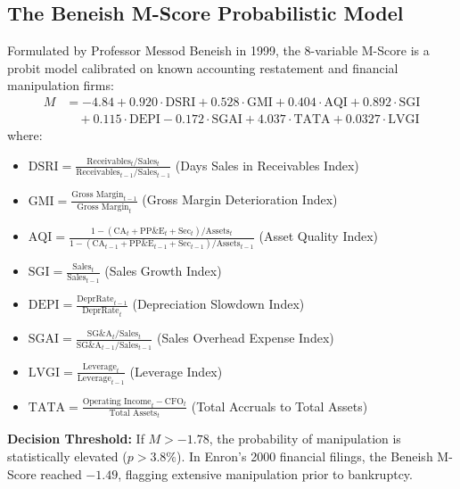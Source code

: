 \subsection{The Beneish M-Score Probabilistic Model}
Formulated by Professor Messod Beneish in 1999, the 8-variable M-Score is a probit model calibrated on known accounting restatement and financial manipulation firms:
\begin{align}
M &= -4.84 + 0.920 \cdot \text{DSRI} + 0.528 \cdot \text{GMI} + 0.404 \cdot \text{AQI} + 0.892 \cdot \text{SGI} \nonumber \\
&\quad + 0.115 \cdot \text{DEPI} - 0.172 \cdot \text{SGAI} + 4.037 \cdot \text{TATA} + 0.0327 \cdot \text{LVGI}
\label{eq:beneish_m}
\end{align}
where:
\begin{itemize}
    \item $\text{DSRI} = \frac{\text{Receivables}_t / \text{Sales}_t}{\text{Receivables}_{t-1} / \text{Sales}_{t-1}}$ (Days Sales in Receivables Index)
    \item $\text{GMI} = \frac{\text{Gross Margin}_{t-1}}{\text{Gross Margin}_t}$ (Gross Margin Deterioration Index)
    \item $\text{AQI} = \frac{1 - (\text{CA}_t + \text{PP\&E}_t + \text{Sec}_t)/\text{Assets}_t}{1 - (\text{CA}_{t-1} + \text{PP\&E}_{t-1} + \text{Sec}_{t-1})/\text{Assets}_{t-1}}$ (Asset Quality Index)
    \item $\text{SGI} = \frac{\text{Sales}_t}{\text{Sales}_{t-1}}$ (Sales Growth Index)
    \item $\text{DEPI} = \frac{\text{DeprRate}_{t-1}}{\text{DeprRate}_t}$ (Depreciation Slowdown Index)
    \item $\text{SGAI} = \frac{\text{SG\&A}_t / \text{Sales}_t}{\text{SG\&A}_{t-1} / \text{Sales}_{t-1}}$ (Sales Overhead Expense Index)
    \item $\text{LVGI} = \frac{\text{Leverage}_t}{\text{Leverage}_{t-1}}$ (Leverage Index)
    \item $\text{TATA} = \frac{\text{Operating Income}_t - \text{CFO}_t}{\text{Total Assets}_t}$ (Total Accruals to Total Assets)
\end{itemize}
\textbf{Decision Threshold:} If $M > -1.78$, the probability of manipulation is statistically elevated ($p > 3.8\%$). In Enron's 2000 financial filings, the Beneish M-Score reached $-1.49$, flagging extensive manipulation prior to bankruptcy.

